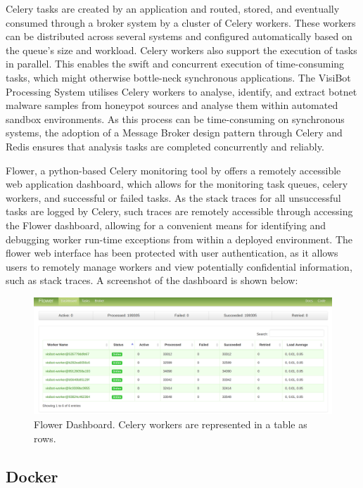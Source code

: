Celery tasks are created by an application and routed, stored, and eventually consumed through a broker system by a cluster of Celery workers. These workers can be distributed across several systems and configured automatically based on the queue's size and workload. Celery workers also support the execution of tasks in parallel. This enables the swift and concurrent execution of time-consuming tasks, which might otherwise bottle-neck synchronous applications. The VisiBot Processing System utilises Celery workers to analyse, identify, and extract botnet malware samples from honeypot sources and analyse them within automated sandbox environments. As this process can be time-consuming on synchronous systems, the adoption of a Message Broker design pattern through Celery and Redis ensures that analysis tasks are completed concurrently and reliably.

Flower, a python-based Celery monitoring tool by \citet{CeleryFlower} offers a remotely accessible web application dashboard, which allows for the monitoring task queues, celery workers, and successful or failed tasks. As the stack traces for all unsuccessful tasks are logged by Celery, such traces are remotely accessible through accessing the Flower dashboard, allowing for a convenient means for identifying and debugging worker run-time exceptions from within a deployed environment. The flower web interface has been protected with user authentication, as it allows users to remotely manage workers and view potentially confidential information, such as stack traces. A screenshot of the dashboard is shown below:

\begin{figure}
    \centering
    \includegraphics[width=1.0\linewidth]{images/flower-panel.png}
    \caption{Flower Dashboard. Celery workers are represented in a table as rows.}
    \label{fig:flower_dashboard} 
\end{figure}

\subsection{Docker}

